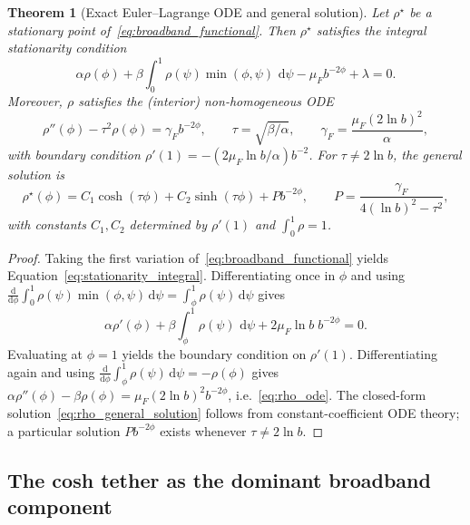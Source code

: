 \documentclass[11pt]{article}
\theoremstyle{plain}
\newtheorem{theorem}{Theorem}
\theoremstyle{definition}
\theoremstyle{remark}
\newcommand{\dd}{\,\mathrm{d}}
\begin{document}
\begin{theorem}[Exact Euler--Lagrange ODE and general solution]
Let $\rho^\star$ be a stationary point of~\eqref{eq:broadband_functional}. Then
$\rho^\star$ satisfies the integral stationarity condition
\begin{equation}
\alpha\rho(\phi)+\beta\int_0^1\rho(\psi)\min(\phi,\psi)\,\dd\psi-\mu_F b^{-2\phi}+\lambda=0.
\label{eq:stationarity_integral}
\end{equation}
Moreover, $\rho$ satisfies the (interior) non-homogeneous ODE
\begin{equation}
\rho''(\phi)-\tau^2\rho(\phi)=\gamma_F b^{-2\phi},\qquad
\tau=\sqrt{\beta/\alpha},\qquad
\gamma_F=\frac{\mu_F(2\ln b)^2}{\alpha},
\label{eq:rho_ode}
\end{equation}
with boundary condition $\rho'(1)=-(2\mu_F\ln b/\alpha)b^{-2}$.
For $\tau\neq 2\ln b$, the general solution is
\begin{equation}
\rho^\star(\phi)=C_1\cosh(\tau\phi)+C_2\sinh(\tau\phi)+P b^{-2\phi},\qquad
P=\frac{\gamma_F}{4(\ln b)^2-\tau^2},
\label{eq:rho_general_solution}
\end{equation}
with constants $C_1,C_2$ determined by $\rho'(1)$ and $\int_0^1\rho=1$.
\end{theorem}
\begin{proof}
Taking the first variation of~\eqref{eq:broadband_functional} yields
Equation~\eqref{eq:stationarity_integral}. Differentiating once in $\phi$ and
using $\frac{\mathrm{d}}{\mathrm{d}\phi}\int_0^1\rho(\psi)\min(\phi,\psi)\dd\psi
=\int_\phi^1\rho(\psi)\dd\psi$ gives
\begin{equation}
\alpha\rho'(\phi)+\beta\int_{\phi}^{1}\rho(\psi)\,\dd\psi + 2\mu_F\ln b\;b^{-2\phi}=0.
\end{equation}
Evaluating at $\phi=1$ yields the boundary condition on $\rho'(1)$.
Differentiating again and using $\frac{\mathrm{d}}{\mathrm{d}\phi}\int_\phi^1\rho(\psi)\dd\psi=-\rho(\phi)$
gives $\alpha\rho''(\phi)-\beta\rho(\phi)=\mu_F(2\ln b)^2 b^{-2\phi}$, i.e.\
\eqref{eq:rho_ode}. The closed-form solution~\eqref{eq:rho_general_solution}
follows from constant-coefficient ODE theory; a particular solution $Pb^{-2\phi}$
exists whenever $\tau\neq 2\ln b$.
\end{proof}

\subsection{The cosh tether as the dominant broadband component}
\end{document}
